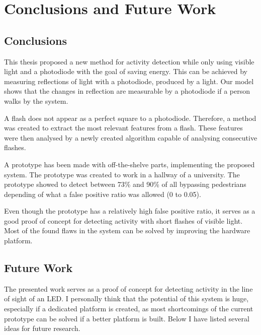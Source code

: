 \chapter{Conclusions and Future Work}
\label{chp:conclusionsandfuturework}

\section{Conclusions}
This thesis proposed a new method for activity detection while only using visible light and a photodiode with the goal of saving energy. This can be achieved by measuring reflections of light with a photodiode, produced by a light. Our model shows that the changes in reflection are measurable by a photodiode if a person walks by the system.

A flash does not appear as a perfect square to a photodiode. Therefore, a method was created to extract the most relevant features from a flash. These features were then analysed by a newly created algorithm capable of analysing consecutive flashes.

A prototype has been made with off-the-shelve parts, implementing the proposed system. The prototype was created to work in a hallway of a university. The prototype showed to detect between 73\% and 90\% of all bypassing pedestrians depending of what a false positive ratio was allowed (0 to 0.05).  

Even though the prototype has a relatively high false positive ratio, it serves as a good proof of concept for detecting activity with short flashes of visible light. Most of the found flaws in the system can be solved by improving the hardware platform.

\section{Future Work}
The presented work serves as a proof of concept for detecting activity in the line of sight of an LED. I personally think that the potential of this system is huge, especially if a dedicated platform is created, as most shortcomings of the current prototype can be solved if a better platform is built. Below I have listed several ideas for future research.

